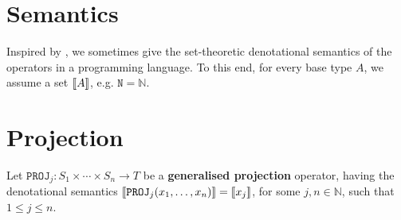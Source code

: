 







\section{Semantics}

Inspired by \cite{hofmann-2003}, we sometimes give the set-theoretic
denotational semantics of the operators in a programming language. To this end,
for every base type $A$, we assume a set ${\mathopen{}\left\llbracket{A}\right\rrbracket\mathclose{}}$, e.g. $\mathtt{N} =
\mathbb{N}$.

\section{Projection}

\label{sec:generalised-projection}

\begin{definition} Let $\mathtt{PROJ}_j : S_1 \times \cdots \times S_n
\rightarrow T$ be a \textbf{generalised projection} operator, having the
denotational semantics ${\mathopen{}\left\llbracket{\mathtt{PROJ}_j{\ensuremath{\mathopen{}\left({x_1,\ldots,x_n}\right)\mathclose{}}}}\right\rrbracket\mathclose{}} = {\mathopen{}\left\llbracket{x_j}\right\rrbracket\mathclose{}}$,
for some $j,n \in \mathbb{N}$, such that $1 \leq j \leq n$.  \end{definition}

